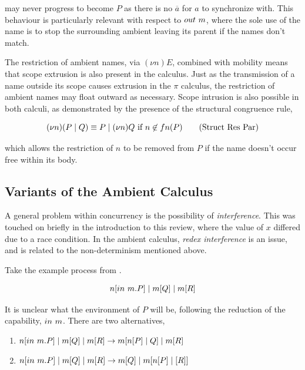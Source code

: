 \noindent may never progress to become $P$ as there is no $\overline{a}$
for $a$ to synchronize with.  This behaviour is particularly relevant
with respect to $out\ m$, where the sole use of the name is to stop
the surrounding ambient leaving its parent if the names don't match.

The restriction of ambient names, via $(\nu n) E$, combined with
mobility means that scope extrusion is also present in the calculus.
Just as the transmission of a name outside its scope causes extrusion
in the $\pi$ calculus, the restriction of ambient names may float
outward as necessary.  Scope intrusion is also possible in both
calculi, as demonstrated by the presence of the structural congruence
rule,

\begin{equation}
(\nu n)(P \pc Q) \equiv P \pc (\nu n) Q\ \text{if}\ n \not \in fn(P) \tag{Struct Res Par}
\end{equation}

\noindent which allows the restriction of $n$ to be removed from $P$
if the name doesn't occur free within its body.

\subsection{Variants of the Ambient Calculus}
\label{ambvariants}

A general problem within concurrency is the possibility of
\emph{interference}.  This was touched on briefly in the introduction
to this review, where the value of $x$ differed due to a race
condition.  In the ambient calculus, \emph{redex interference}
\cite{sangiorgi:mobsafeambients} is an issue, and is related to the
non-determinism mentioned above.

Take the example process from \cite{sangiorgi:mobsafeambients}.

\begin{equation}
n[in\ m.P] \;|\; m[Q] \;|\; m[R]
\end{equation}

\noindent It is unclear what the environment of $P$ will be, following
the reduction of the capability, $in\ m$.  There are two
alternatives,

\begin{enumerate}
\item $n[in\ m.P] \;|\; m[Q] \;|\; m[R] \rightarrow m[n[P] \;|\; Q] \;|\; m[R]$
\item $n[in\ m.P] \;|\; m[Q] \;|\; m[R] \rightarrow m[Q] \;|\; m[n[P] \;|\; [R]]$
\end{enumerate}

